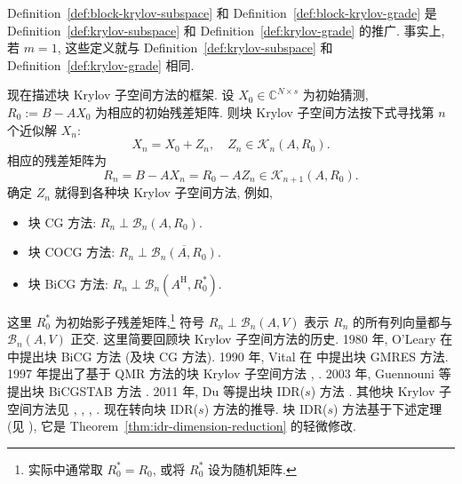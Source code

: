 \par{}
\begin{Remark}\label{rem:block-grade-scalar-reduction}
{Definition\ \ref{def:block-krylov-subspace} 和 Definition\ \ref{def:block-krylov-grade} 是 Definition\ \ref{def:krylov-subspace} 和 Definition\ \ref{def:krylov-grade} 的推广. 事实上, 若 $m=1$, 这些定义就与 Definition\ \ref{def:krylov-subspace} 和 Definition\ \ref{def:krylov-grade} 相同.}
\end{Remark}
{现在描述块 Krylov 子空间方法的框架. 设 $X_0\in\mathbb C^{N\times s}$ 为初始猜测, $R_0:=B-AX_0$ 为相应的初始残差矩阵. 则块 Krylov 子空间方法按下式寻找第 $n$ 个近似解 $X_n$:}
\[X_n=X_0+Z_n,\quad Z_n\in\mathcal K_n(A,R_0).\]
{相应的残差矩阵为}
\[R_n=B-AX_n=R_0-AZ_n\in\mathcal K_{n+1}(A,R_0).\]
{确定 $Z_n$ 就得到各种块 Krylov 子空间方法, 例如,}
\begin{itemize}
\item{块 CG 方法:} $R_n\perp\mathcal B_n(A,R_0)$.
\item{块 COCG 方法:} $R_n\perp\overline{\mathcal B_n(A,R_0)}$.
\item{块 BiCG 方法:} $R_n\perp\mathcal B_n(A^{\mathrm H},R_0^{*})$.
\end{itemize}
{这里 $R_0^{*}$ 为初始影子残差矩阵,}\footnote{{实际中通常取 $R_0^{*}=R_0$, 或将 $R_0^{*}$ 设为随机矩阵.}}
{符号 $R_n\perp\mathcal B_n(A,V)$ 表示 $R_n$ 的所有列向量都与 $\mathcal B_n(A,V)$ 正交.}
{这里简要回顾块 Krylov 子空间方法的历史. 1980 年, O’Leary 在  中提出块 BiCG 方法 (及块 CG 方法). 1990 年, Vital 在  中提出块 GMRES 方法. 1997 年提出了基于 QMR 方法的块 Krylov 子空间方法 , . 2003 年, Guennouni 等提出块 BiCGSTAB 方法 . 2011 年, Du 等提出块 IDR($s$) 方法 . 其他块 Krylov 子空间方法见 , , , .}
{现在转向块 IDR($s$) 方法的推导. 块 IDR($s$) 方法基于下述定理 (见 ), 它是 Theorem\ \ref{thm:idr-dimension-reduction} 的轻微修改.}
\par{}
